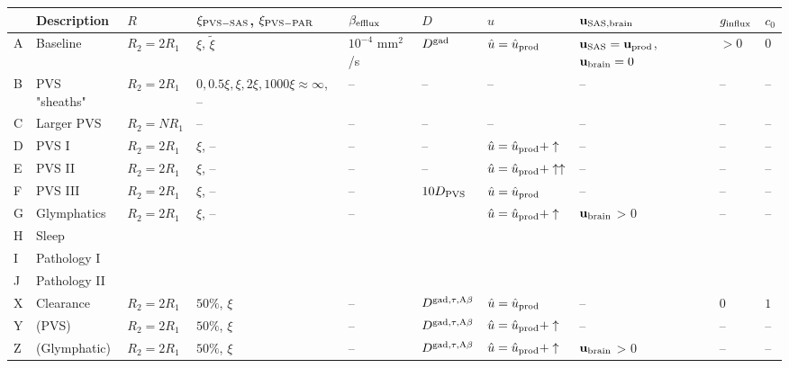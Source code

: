 \documentclass[fleqn,10pt]{wlscirep}
\begin{document}
\begin{table}
\begin{center}
  \begin{tabular}{ll|llllll|ll}
    \toprule
    & Description & $R$ & $\xi_{\rm PVS-SAS}$, $\xi_{\rm PVS-PAR}$ & $\beta_{\rm efflux}$ & $D$ & $\hat{u}$ & $\mathbf{u}_{\rm SAS, brain}$ & $g_{\rm influx}$ & $c_0$ \\
    \midrule
    A & Baseline  & $R_2 = 2 R_1$ & $\xi$, $\tilde \xi$\cite{koch2023estimates} &  $10^{-4}$ mm$^2$/s\cite{hornkjol2022csf} & $D^{\rm gad}$\cite{sykova2008diffusion, valnes2020apparent}  & $\hat{u} = \hat{u}_{\rm prod}$ & $\mathbf{u}_{\rm SAS} = \mathbf{u}_{\rm prod}$, $\mathbf{u}_{\rm brain} = 0$ & $> 0$ & 0 \\
    B & PVS "sheaths" & $R_2 = 2 R_1$ & $0, 0.5 \xi, \xi, 2 \xi, 1000 \xi \approx \infty$, --\cite{koch2023estimates} & -- & --  &  --  & --  & -- & -- \\
    C & Larger PVS & $R_2 = N R_1$ & -- & -- & --  &  --  & -- & -- & -- \\
    D & PVS I & $R_2 = 2 R_1$ & $\xi$, -- & -- & --  &  $\hat{u} = \hat{u}_{\rm prod} + \uparrow$  & -- & -- & -- \\
    E & PVS II & $R_2 = 2 R_1$ & $\xi$, -- & -- & --  &  $\hat{u} = \hat{u}_{\rm prod} + \uparrow\uparrow$  & -- & -- & -- \\
    F & PVS III & $R_2 = 2 R_1$ & $\xi$, -- & -- & $10 D_{\rm PVS}$ &  $\hat{u} = \hat{u}_{\rm prod}$  & -- & -- & -- \\
    G & Glymphatics & $R_2 = 2 R_1$ & $\xi$, -- & -- & \cite{sykova2008diffusion, valnes2020apparent} &  $\hat{u} = \hat{u}_{\rm prod} + \uparrow$  & $\mathbf{u}_{\rm brain}$ > 0 & -- & -- \\
    H & Sleep &  &  & &  &  &  & & \\
    I & Pathology I &  &  & &  &  &  & & \\
    J & Pathology II &  &  & &  &  &  & & \\
    \midrule
    X & Clearance & $R_2 = 2 R_1$ & $50\%$, $\xi$ & -- & $D^{\rm gad, \tau, A\beta}$  &  $\hat{u} = \hat{u}_{\rm prod}$  & -- & $0$ & $1$ \\
    Y & (PVS) & $R_2 = 2 R_1$ & $50\%$, $\xi$ & -- & $D^{\rm gad, \tau, A\beta}$  &  $\hat{u} = \hat{u}_{\rm prod} + \uparrow$  & -- & -- & -- \\
    Z & (Glymphatic) & $R_2 = 2 R_1$ & $50\%$, $\xi$ & -- & $D^{\rm gad, \tau, A\beta}$  &  $\hat{u} = \hat{u}_{\rm prod} + \uparrow$  & $\mathbf{u}_{\rm brain}$ > 0 & -- & -- \\

\end{tabular}
\end{center}
\end{table}
\end{document}
